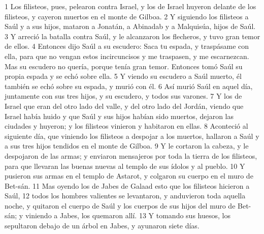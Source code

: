 1 Los filisteos, pues, pelearon contra Israel, y los de Israel huyeron delante de los filisteos, y cayeron muertos en el monte de Gilboa.
2 Y siguiendo los filisteos a Saúl y a sus hijos, mataron a Jonatán, a Abinadab y a Malquisúa, hijos de Saúl.
3 Y arreció la batalla contra Saúl, y le alcanzaron los flecheros, y tuvo gran temor de ellos.
4 Entonces dijo Saúl a su escudero: Saca tu espada, y traspásame con ella, para que no vengan estos incircuncisos y me traspasen, y me escarnezcan. Mas su escudero no quería, porque tenía gran temor. Entonces tomó Saúl su propia espada y se echó sobre ella.
5 Y viendo su escudero a Saúl muerto, él también se echó sobre su espada, y murió con él.
6 Así murió Saúl en aquel día, juntamente con sus tres hijos, y su escudero, y todos sus varones.
7 Y los de Israel que eran del otro lado del valle, y del otro lado del Jordán, viendo que Israel había huido y que Saúl y sus hijos habían sido muertos, dejaron las ciudades y huyeron; y los filisteos vinieron y habitaron en ellas.
8 Aconteció al siguiente día, que viniendo los filisteos a despojar a los muertos, hallaron a Saúl y a sus tres hijos tendidos en el monte de Gilboa.
9 Y le cortaron la cabeza, y le despojaron de las armas; y enviaron mensajeros por toda la tierra de los filisteos, para que llevaran las buenas nuevas al templo de sus ídolos y al pueblo.
10 Y pusieron sus armas en el templo de Astarot, y colgaron su cuerpo en el muro de Bet-sán.
11 Mas oyendo los de Jabes de Galaad esto que los filisteos hicieron a Saúl,
12 todos los hombres valientes se levantaron, y anduvieron toda aquella noche, y quitaron el cuerpo de Saúl y los cuerpos de sus hijos del muro de Bet-sán; y viniendo a Jabes, los quemaron allí.
13 Y tomando sus huesos, los sepultaron debajo de un árbol en Jabes, y ayunaron siete días.

